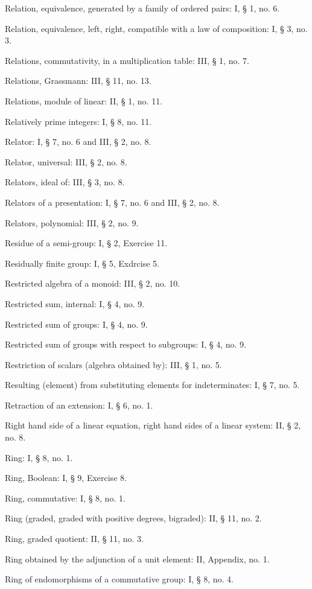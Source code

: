 Relation, equivalence, generated by a family of ordered pairs: I, § 1, no. 6.

Relation, equivalence, left, right, compatible with a law of composition: I, § 3, no. 3.

Relations, commutativity, in a multiplication table: III, § 1, no. 7.

Relations, Grassmann: III, § 11, no. 13.

Relations, module of linear: II, § 1, no. 11.

Relatively prime integers: I, § 8, no. 11.

Relator: I, § 7, no. 6 and III, § 2, no. 8.

Relator, universal: III, § 2, no. 8.

Relators, ideal of: III, § 3, no. 8.

Relators of a presentation: I, § 7, no. 6 and III, § 2, no. 8.

Relators, polynomial: III, § 2, no. 9.

Residue of a semi-group: I, § 2, Exercise 11.

Residually finite group: I, § 5, Exdrcise 5.

Restricted algebra of a monoid: III, § 2, no. 10.

Restricted sum, internal: I, § 4, no. 9.

Restricted sum of groups: I, § 4, no. 9.

Restricted sum of groups with respect to subgroups: I, § 4, no. 9.

Restriction of scalars (algebra obtained by): III, § 1, no. 5.

Resulting (element) from substituting elements for indeterminates: I, § 7, no. 5.

Retraction of an extension: I, § 6, no. 1.

Right hand side of a linear equation, right hand sides of a linear system: II, § 2, no. 8.

Ring: I, § 8, no. 1.

Ring, Boolean: I, § 9, Exercise 8.

Ring, commutative: I, § 8, no. 1.

Ring (graded, graded with positive degrees, bigraded): II, § 11, no. 2.

Ring, graded quotient: II, § 11, no. 3.

Ring obtained by the adjunction of a unit element: II, Appendix, no. 1.

Ring of endomorphisms of a commutative group: I, § 8, no. 4.

